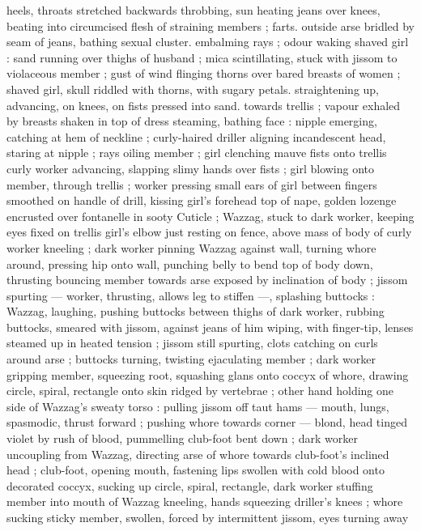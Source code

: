 heels, throats stretched backwards throbbing, sun heating jeans over 
knees, beating into circumcised flesh of straining members ; farts. 
outside arse bridled by seam of jeans, bathing sexual cluster. 
embalming rays ; odour waking shaved girl : sand running over 
thighs of husband ; mica scintillating, stuck with jissom to violaceous 
member ; gust of wind flinging thorns over bared breasts of women 
; shaved girl, skull riddled with thorns, with sugary petals. 
straightening up, advancing, on knees, on fists pressed into sand. 
towards trellis ; vapour exhaled by breasts shaken in top of dress 
steaming, bathing face : nipple emerging, catching at hem of 
neckline ; curly-haired driller aligning incandescent head, staring at 
nipple ; rays oiling member ; girl clenching mauve fists onto trellis 
curly worker advancing, slapping slimy hands over fists ; girl blowing 
onto member, through trellis ; worker pressing small ears of girl 
between fingers smoothed on handle of drill, kissing girl's forehead 
top of nape, golden lozenge encrusted over fontanelle in sooty 
Cuticle ; Wazzag, stuck to dark worker, keeping eyes fixed on trellis 
girl's elbow just resting on fence, above mass of body of curly 
worker kneeling ; dark worker pinning Wazzag against wall, turning 
whore around, pressing hip onto wall, punching belly to bend top of 
body down, thrusting bouncing member towards arse exposed by 
inclination of body ; jissom spurting --- worker, thrusting, allows leg 
to stiffen ---, splashing buttocks : Wazzag, laughing, pushing 
buttocks between thighs of dark worker, rubbing buttocks, smeared 
with jissom, against jeans of him wiping, with finger-tip, lenses 
steamed up in heated tension ; jissom still spurting, clots catching on 
curls around arse ; buttocks turning, twisting ejaculating member ; 
dark worker gripping member, squeezing root, squashing glans onto 
coccyx of whore, drawing circle, spiral, rectangle onto skin ridged by 
vertebrae ; other hand holding one side of Wazzag's sweaty torso : 
pulling jissom off taut hams --- mouth, lungs, spasmodic, thrust 
forward ; pushing whore towards corner --- blond, head tinged violet 
by rush of blood, pummelling club-foot bent down ; dark worker 
uncoupling from Wazzag, directing arse of whore towards club-foot's 
inclined head ; club-foot, opening mouth, fastening lips swollen with 
cold blood onto decorated coccyx, sucking up circle, spiral, 
rectangle, dark worker stuffing member into mouth of Wazzag 
kneeling, hands squeezing driller's knees ; whore sucking sticky 
member, swollen, forced by intermittent jissom, eyes turning away 
